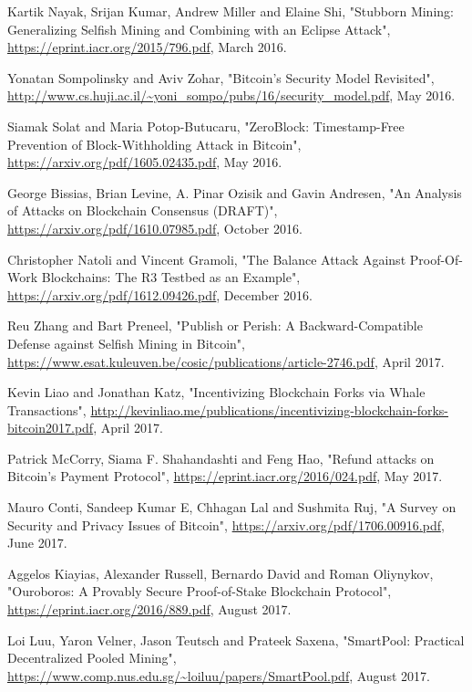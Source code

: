 \documentclass[11pt,a4paper]{article}
\begin{document}
\begin{thebibliography}{9}
Kartik Nayak, Srijan Kumar, Andrew Miller and Elaine Shi,
"Stubborn Mining: Generalizing Selfish Mining and Combining with an Eclipse Attack",
\url{https://eprint.iacr.org/2015/796.pdf},
March 2016.

Yonatan Sompolinsky and Aviv Zohar,
"Bitcoin's Security Model Revisited",
\url{http://www.cs.huji.ac.il/~yoni_sompo/pubs/16/security_model.pdf},
May 2016.

Siamak Solat and Maria Potop-Butucaru,
"ZeroBlock: Timestamp-Free Prevention of Block-Withholding Attack in Bitcoin",
\url{https://arxiv.org/pdf/1605.02435.pdf},
May 2016.

George Bissias, Brian Levine, A. Pinar Ozisik and Gavin Andresen,
"An Analysis of Attacks on Blockchain Consensus (DRAFT)",
\url{https://arxiv.org/pdf/1610.07985.pdf},
October 2016.

Christopher Natoli and Vincent Gramoli,
"The Balance Attack Against Proof-Of-Work Blockchains: The R3 Testbed as an Example",
\url{https://arxiv.org/pdf/1612.09426.pdf},
December 2016.

Reu Zhang and Bart Preneel,
"Publish or Perish: A Backward-Compatible Defense against Selfish Mining in Bitcoin",
\url{https://www.esat.kuleuven.be/cosic/publications/article-2746.pdf},
April 2017.

Kevin Liao and Jonathan Katz,
"Incentivizing Blockchain Forks via Whale Transactions",
\url{http://kevinliao.me/publications/incentivizing-blockchain-forks-bitcoin2017.pdf},
April 2017.

Patrick McCorry, Siama F. Shahandashti and Feng Hao,
"Refund attacks on Bitcoin's Payment Protocol",
\url{https://eprint.iacr.org/2016/024.pdf},
May 2017.

Mauro Conti, Sandeep Kumar E, Chhagan Lal and Sushmita Ruj,
"A Survey on Security and Privacy Issues of Bitcoin",
\url{https://arxiv.org/pdf/1706.00916.pdf},
June 2017.

Aggelos Kiayias, Alexander Russell, Bernardo David and Roman Oliynykov,
"Ouroboros: A Provably Secure Proof-of-Stake Blockchain Protocol",
\url{https://eprint.iacr.org/2016/889.pdf},
August 2017.

Loi Luu, Yaron Velner, Jason Teutsch and Prateek Saxena,
"SmartPool: Practical Decentralized Pooled Mining",
\url{https://www.comp.nus.edu.sg/~loiluu/papers/SmartPool.pdf},
August 2017.


\end{thebibliography}
\end{document}
